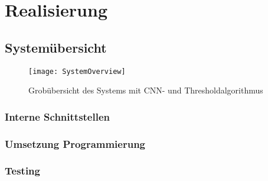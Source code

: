 \chapter{Realisierung}

\section{Systemübersicht}

\begin{figure}[H]
	\texttt{[image: SystemOverview]}
	\caption{Grobübersicht des Systems mit CNN- und Thresholdalgorithmus}
	\label{SystemOverview}
\end{figure}

\subsection{Interne Schnittstellen}


\subsection{Umsetzung Programmierung}

\subsection{Testing}

